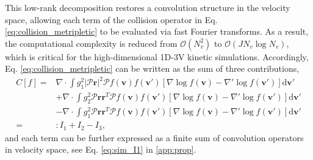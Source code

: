 \documentclass[preprint,1p,times]{elsarticle}
\newcommand{\cO}{\mathcal{O}}
\theoremstyle{definition}
\theoremstyle{remark}
\begin{document}
This low-rank decomposition restores a convolution structure in the velocity space, allowing each term of the collision operator in Eq. \eqref{eq:collision_metripletic} to be evaluated via fast Fourier transforms. As a result, the computational complexity is reduced from $\cO(N_{v}^{2})$ to $\cO(JN_{v} \log N_{v})$, which is critical for the high-dimensional 1D-3V kinetic simulations.
%
Accordingly, Eq. \eqref{eq:collision_metripletic} can be written as the sum of three contributions,
\begin{equation}\label{eq:sim_C}
    \begin{aligned}
        C[f] =& \nabla \cdot \int g_{1}^{2} |\bm{\mathcal{P}}\bm{r}|^{2} \bm{\mathcal{P}} f(\bm{v}) f(\bm{v}') \left[ \nabla \log f(\bm{v}) - \nabla'\log f(\bm{v}') \right] \mathrm{d}\bm{v}' \\
        &+ \nabla \cdot \int g_{2}^{2} \bm{\mathcal{P}} \bm{r} \bm{r}^{T} \bm{\mathcal{P}} f(\bm{v}) f(\bm{v}') \left[ \nabla \log f(\bm{v}) - \nabla'\log f(\bm{v}') \right] \mathrm{d}\bm{v}' \\
        &- \nabla \cdot \int g_{1}^{2} \bm{\mathcal{P}} \bm{r} \bm{r}^{T} \bm{\mathcal{P}} f(\bm{v}) f(\bm{v}') \left[ \nabla \log f(\bm{v}) - \nabla'\log f(\bm{v}') \right] \mathrm{d}\bm{v}' \\
        =&: I_{1} + I_{2} - I_{3},
    \end{aligned}
\end{equation}
and each term can be further expressed as a finite sum of convolution operators in velocity space, see Eq. \eqref{eq:sim_I1} in \ref{app:prop}.
\end{document}
